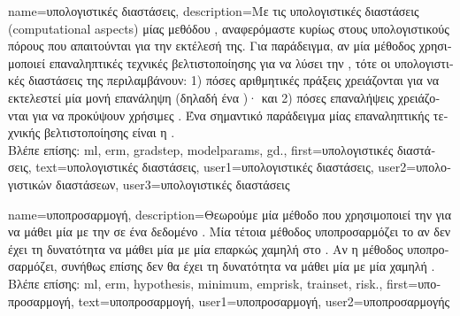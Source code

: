 {name={\foreignlanguage{greek}{υπολογιστικές διαστάσεις}}, 
	description={\foreignlanguage{greek}{Με τις υπολογιστικές διαστάσεις} (computational aspects) 
		\foreignlanguage{greek}{μίας μεθόδου} , \foreignlanguage{greek}{αναφερόμαστε κυρίως στους υπολογιστικούς πόρους  
		που απαιτούνται για την εκτέλεσή της. Για παράδειγμα, αν μία μέθοδος}  \foreignlanguage{greek}{χρησιμοποιεί  
		επαναληπτικές τεχνικές βελτιστοποίησης για να λύσει την} , \foreignlanguage{greek}{τότε οι υπολογιστικές διαστάσεις 
		της περιλαμβάνουν: 1) πόσες αριθμητικές πράξεις χρειάζονται για να εκτελεστεί μία μονή επανάληψη (δηλαδή ένα} )·  
		\foreignlanguage{greek}{και 2) πόσες επαναλήψεις χρειάζονται για να προκύψουν χρήσιμες} . 
		\foreignlanguage{greek}{Ένα σημαντικό παράδειγμα μίας επαναληπτικής τεχνικής βελτιστοποίησης είναι η} .\\
		\foreignlanguage{greek}{Βλέπε επίσης:} \gls{ml}, \gls{erm}, \gls{gradstep}, \glspl{modelparam}, \gls{gd}.}, 
	first={\foreignlanguage{greek}{υπολογιστικές διαστάσεις}},
	text={\foreignlanguage{greek}{υπολογιστικές διαστάσεις}},
	user1={\foreignlanguage{greek}{υπολογιστικές διαστάσεις}}, %
	user2={\foreignlanguage{greek}{υπολογιστικών διαστάσεων}}, %
	user3={\foreignlanguage{greek}{υπολογιστικές διαστάσεις}} %
}

{name={\foreignlanguage{greek}{υποπροσαρμογή}},
	description={\foreignlanguage{greek}{Θεωρούμε μία μέθοδο} 
		 \foreignlanguage{greek}{που χρησιμοποιεί την}  \foreignlanguage{greek}{για να 
		μάθει μία}  \foreignlanguage{greek}{με την}   
		\foreignlanguage{greek}{σε ένα δεδομένο} . \foreignlanguage{greek}{Μία τέτοια μέθοδος 
		υποπροσαρμόζει το}  \foreignlanguage{greek}{αν δεν έχει τη δυνατότητα να μάθει μία} 
		 \foreignlanguage{greek}{με μία επαρκώς χαμηλή}  \foreignlanguage{greek}{στο} 
		. \foreignlanguage{greek}{Αν η μέθοδος υποπροσαρμόζει, συνήθως επίσης δεν θα έχει τη 
		δυνατότητα να μάθει μία}  \foreignlanguage{greek}{με μία χαμηλή} .\\
		\foreignlanguage{greek}{Βλέπε επίσης:} \gls{ml}, \gls{erm}, \gls{hypothesis}, \gls{minimum}, \gls{emprisk}, \gls{trainset}, \gls{risk}.},
	first={\foreignlanguage{greek}{υποπροσαρμογή}},
	text={\foreignlanguage{greek}{υποπροσαρμογή}},
	user1={\foreignlanguage{greek}{υποπροσαρμογή}}, %
    	user2={\foreignlanguage{greek}{υποπροσαρμογής}} %
}

